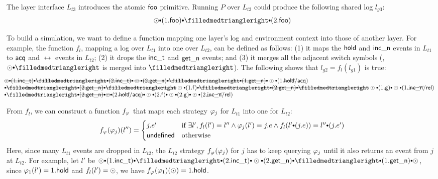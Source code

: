 The layer interface $L_{t3}$ introduces the atomic $\mathsf{foo}$
primitive. Running $P$ over $L_{t3}$ could produce the following shared log
$l_{g3}$:
\[
\ssame \cons (1.\comm{foo})
\cons \sdiff \cons (2.\comm{foo})
\]

To build a simulation, we want to define a function mapping one
layer's log and environment context into those of another layer.  For
example, the function $f_l$, mapping a log over $L_{t1}$ into one over
$L_{t2}$, can be defined as follows: (1) it maps the $\mathsf{hold}$ and
$\mathsf{inc\_n}$ events in $L_{t1}$ to $\mathsf{acq}$ and $\rel$ events in $L_{t2}$; (2) it
drops the $\mathsf{inc\_t}$ and $\mathsf{get\_n}$ events; 
and (3) it merges all the adjacent switch symbols (\eg,
$\ssame \cons \sdiff$ is merged into $\sdiff$).
The following shows that $l_{g2} = f_l (l_{g1})$ is true:
\[
\begin{array}{l}
\hspace*{-1em}\mysout
{\ssame \cons (1.\incticket) \cons
\sdiff \cons (2.\incticket) \cons
\ssame \cons (2.\getnow) \cons
\sdiff \cons (1.\getnow) \cons
}
\ssame \cons (1.\cancel{\holdlock}/\acq) 
\\
\hspace*{-1em}\mysout
{\cons 
\sdiff \cons (2.\getnow) \cons
\sdiff 
} 
\ssame \cons (1.\comm{f}) \cons
\mysout
{\sdiff \cons (2.\getnow) \cons
\sdiff
}
\ssame \cons (1.\comm{g}) \cons
\ssame \cons (1.\cancel{\incnow}/\rel) 
\\
\hspace*{-1em}\cons \sdiff 
\mysout
{\cons (2.\getnow) \cons
\ssame 
}
\cons (2.\cancel{\holdlock}/\acq) \cons
\ssame \cons (2.\comm{f}) \cons
\ssame \cons (2.\comm{g}) \cons
\ssame \cons (2.\cancel{\incnow}/\rel) 
\end{array}
\]

From $f_l$, we can construct a function $f_{\varphi_{}}$
that maps each strategy $\varphi_{j}$ for $L_{t1}$ into one for $L_{t2}$:
\[ 
f_{\strat{}}(\strat{j}) (l'')=
\begin{cases}
j.e' & \text{if } 
\exists l', f_l(l') = l'' \wedge \strat{j}(l') = j.e
\wedge f_l(l'\cons(j.e)) = l'' \cons (j.e') \\
\comm{undefined } & \text{otherwise}
\end{cases}
\]
Here, since many $L_{t1}$ events are dropped in $L_{t2}$,
the $L_{t2}$ strategy $f_{\varphi_{}}(\varphi_{j})$ for $j$
has to keep querying $\varphi_{j}$ until
it also returns an event from $j$ at $L_{t2}$.  For example, let $l'$ be
$\ssame \cons (1.\incticket) \cons \sdiff \cons (2.\incticket) \cons
\ssame \cons (2.\getnow) \cons \sdiff \cons (1.\getnow) \cons \ssame$,
since $\varphi_{1} (l') = 1.\mathsf{hold}$ and $f_l(l') = \odot$, we have
$f_{\varphi_{}}(\varphi_{1}) (\odot) =1.\mathsf{hold}$.

